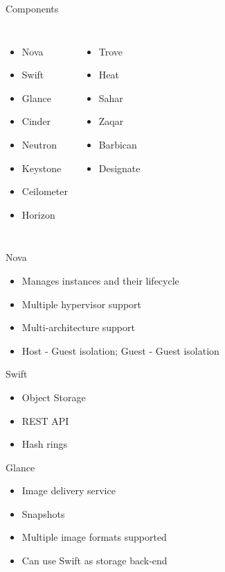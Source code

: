 \documentclass{beamer}
\begin{document}
\begin{frame}{Components}
\begin{columns}[c]
\begin{itemize}
 \item Nova
 \item Swift
 \pause 
 \item Glance
 \item Cinder
 \pause
 \item Neutron
 \pause
 \item Keystone
 \pause
 \item Ceilometer
 \item Horizon
 \pause
 \end{itemize}
 \begin{itemize}
 \item Trove
 \item Heat
 \pause
 \item Sahar
 \item Zaqar
 \item Barbican
 \item Designate
\end{itemize}
\end{columns}
\end{frame}

\begin{frame}{Nova}
\begin{itemize}
 \item Manages instances and their lifecycle
 \item Multiple hypervisor support
 \item Multi-architecture support
 \item Host - Guest isolation; Guest - Guest isolation
\end{itemize}
\end{frame}

\begin{frame}{Swift}
\begin{itemize}
 \item Object Storage
 \item REST API
 \item Hash rings
\end{itemize}
\end{frame}

\begin{frame}{Glance}
\begin{itemize}
 \item Image delivery service
 \item Snapshots
 \item Multiple image formats supported
 \item Can use Swift as storage back-end
\end{itemize}
\end{frame}
\end{document}
